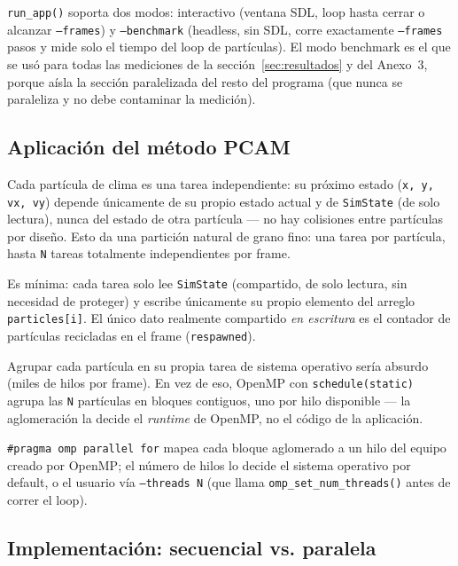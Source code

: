 \documentclass[12pt,letterpaper]{article}
\begin{document}
\texttt{run\_app()} soporta dos modos: interactivo (ventana SDL, loop
hasta cerrar o alcanzar \texttt{--frames}) y \texttt{--benchmark}
(headless, sin SDL, corre exactamente \texttt{--frames} pasos y mide solo
el tiempo del loop de partículas). El modo benchmark es el que se usó
para todas las mediciones de la sección~\ref{sec:resultados} y del
Anexo~3, porque aísla la sección paralelizada del resto del programa
(que nunca se paraleliza y no debe contaminar la medición).

\subsection{Aplicación del método PCAM}
\label{sec:pcam}

\begin{description}[leftmargin=2em,style=nextline]
\item[Partición] Cada partícula de clima es una tarea independiente: su
próximo estado (\texttt{x, y, vx, vy}) depende únicamente de su propio
estado actual y de \texttt{SimState} (de solo lectura), nunca del estado
de otra partícula --- no hay colisiones entre partículas por diseño. Esto
da una partición natural de grano fino: una tarea por partícula, hasta
\texttt{N} tareas totalmente independientes por frame.
\item[Comunicación] Es mínima: cada tarea solo lee \texttt{SimState}
(compartido, de solo lectura, sin necesidad de proteger) y escribe
únicamente su propio elemento del arreglo \texttt{particles[i]}. El único
dato realmente compartido \emph{en escritura} es el contador de
partículas recicladas en el frame (\texttt{respawned}).
\item[Aglomeración] Agrupar cada partícula en su propia tarea de sistema
operativo sería absurdo (miles de hilos por frame). En vez de eso,
OpenMP con \texttt{schedule(static)} agrupa las \texttt{N} partículas en
bloques contiguos, uno por hilo disponible --- la aglomeración la decide
el \emph{runtime} de OpenMP, no el código de la aplicación.
\item[Mapeo] \texttt{\#pragma omp parallel for} mapea cada bloque
aglomerado a un hilo del equipo creado por OpenMP; el número de hilos lo
decide el sistema operativo por default, o el usuario vía \texttt{--threads
N} (que llama \texttt{omp\_set\_num\_threads()} antes de correr el loop).
\end{description}

\subsection{Implementación: secuencial vs. paralela}
\end{document}
